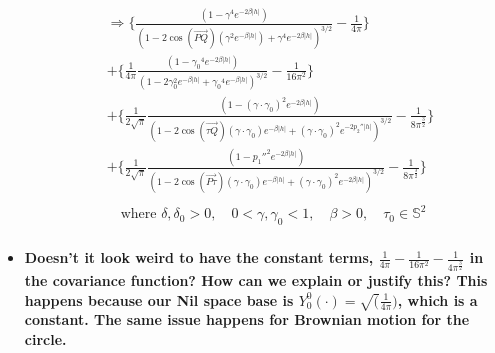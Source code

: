 \documentclass[11pt]{article}
\begin{document}
\begin{itemize}
\begin{align*}
\\
&\Rightarrow \biggl\{ \frac{(1 - {\gamma}^4 e^{-2 \beta \lvert h \lvert})}{(1-2 \cos{(\overrightarrow{PQ})} (\gamma^2 e^{-\beta \lvert h \lvert}) + {\gamma}^4 e^{-2 \beta \lvert h \lvert})^{3/2}} - \frac{1}{4\pi} \biggl\}\\
&+ \biggl\{ \frac{1}{4\pi}\frac{(1 - {\gamma_0}^4 e^{-2 \beta \lvert h \lvert})}{(1-2 \gamma_0^2 e^{- \beta \lvert h \lvert} + {\gamma_0}^4 e^{-\beta \lvert h \lvert})^{3/2}}  - \frac{1}{16\pi^2} \biggl\}\\ 
&+ \biggl\{ \frac{1}{2\sqrt{\pi}}\frac{(1 - {(\gamma \cdot \gamma_0)}^2 e^{-2 \beta \lvert h \lvert})}{(1-2 \cos{(\overrightarrow{\tau Q})} (\gamma \cdot \gamma_0) e^{-\beta \lvert h \lvert} + {(\gamma \cdot \gamma_0)}^2 e^{-2p_2'' \lvert h \lvert})^{3/2}} - \frac{1}{8\pi^\frac{3}{2}} \biggl\}\\
& + \biggl\{ \frac{1}{2\sqrt{\pi}} \frac{(1 - {p_1''}^2 e^{-2 \beta \lvert h \lvert})}{(1-2 \cos{(\overrightarrow{P \tau})} (\gamma \cdot \gamma_0) e^{-\beta \lvert h \lvert} + {(\gamma \cdot \gamma_0)}^2 e^{-2 \beta \lvert h \lvert})^{3/2}} - \frac{1}{8\pi^\frac{3}{2}} \biggl\}\\
\\
&\quad \text{where } \delta, \delta_{0}>0, \quad 0<\gamma, \gamma_{0} < 1, \quad \beta >0, \quad \tau_{0} \in \mathbb{S}^2 \\
\end{align*}

\item
\textbf{{\color{red} Doesn't it look weird to have the constant terms, $\frac{1}{4\pi} - \frac{1}{16\pi^2} - \frac{1}{4\pi^\frac{3}{2}}$ in the covariance function? How can we explain or justify this? This happens because our Nil space base is $Y_0^0(\cdot)=\sqrt(\frac{1}{4\pi})$, which is a constant. The same issue happens for Brownian motion for the circle.}}\\


\end{itemize}
\end{document}
